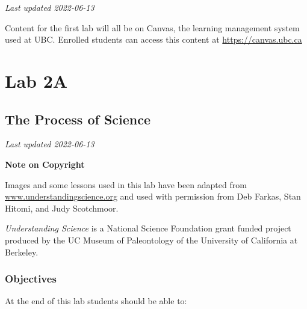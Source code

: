 \documentclass[
]{book}
\begin{document}
\emph{Last updated 2022-06-13}

Content for the first lab will all be on Canvas, the learning management system used at UBC. Enrolled students can access this content at \url{https://canvas.ubc.ca}

\hypertarget{part-lab-2a}{%
\part*{Lab 2A}\label{part-lab-2a}}

\hypertarget{the-process-of-science}{%
\chapter*{The Process of Science}\label{the-process-of-science}}

\emph{Last updated 2022-06-13}

\textbf{Note on Copyright}

Images and some lessons used in this lab have been adapted from \href{http://www.understandingscience.org/}{www.understandingscience.org} and used with permission from Deb Farkas, Stan Hitomi, and Judy Scotchmoor.

\emph{Understanding Science} is a National Science Foundation grant funded project produced by the UC Museum of Paleontology of the University of California at Berkeley.

\hypertarget{objectives}{%
\section*{Objectives}\label{objectives}}

At the end of this lab students should be able to:
\end{document}
